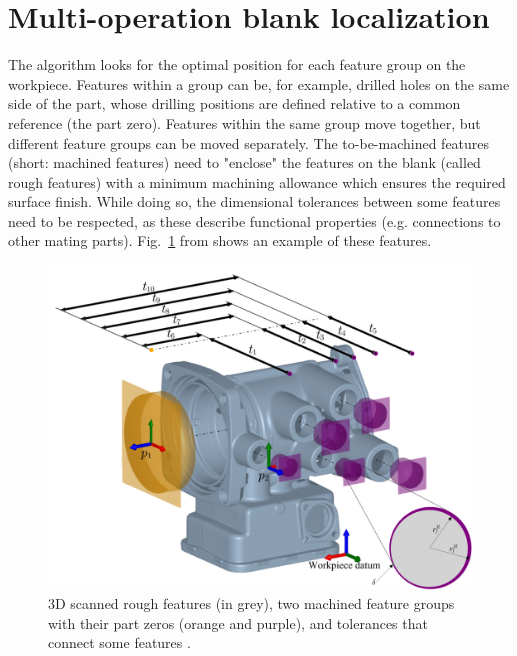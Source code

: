 \documentclass{juliacon}
\begin{document}
\section{Multi-operation blank localization}
\label{sec:algo}

The algorithm looks for the optimal position for each feature group on the workpiece.
Features within a group can be, for example, drilled holes on the same side of the part, whose drilling positions are defined relative to a common reference (the part zero).
Features within the same group move together, but different feature groups can be moved separately.
The to-be-machined features (short: machined features) need to "enclose" the features on the blank (called rough features) with a minimum machining allowance which ensures the required surface finish.
While doing so, the dimensional tolerances between some features need to be respected, as these describe functional properties (e.g. connections to other mating parts).
Fig.~\ref{fig:hatfig} from \cite{cserteg:2023_Annals} shows an example of these features.

\begin{figure}[hbt]
	\centerline{\includegraphics[width=0.95\columnwidth]{cirp-annals-2023-figure-2.png}}
	\caption{3D scanned rough features (in grey), two machined feature groups with their part zeros (orange and purple), and tolerances that connect some features \cite{cserteg:2023_Annals}.}
	\label{fig:hatfig}
\end{figure}
\end{document}

